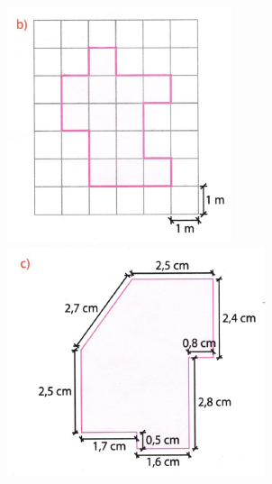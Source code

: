 \documentclass[a4paper,14pt]{article}
\begin{document}
\begin{multicols}{2}
\begin{enumerate}
			\includegraphics[width=1\linewidth]{6FMA89_imagens/imagem02}
			\includegraphics[width=1\linewidth]{6FMA89_imagens/imagem03}

\end{enumerate}
\end{multicols}
\end{document}
